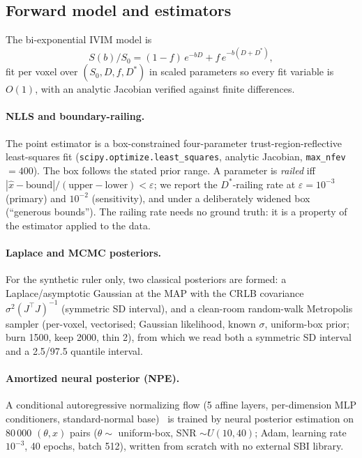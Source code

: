 \documentclass[11pt]{article}
\renewcommand{\d}{D}                 %
\newcommand{\Ds}{D^{*}}
\begin{document}
\subsection{Forward model and estimators}

The bi-exponential IVIM model is
\begin{equation}
S(b)/S_0 = (1-f)\,e^{-bD} + f\,e^{-b(D+\Ds)},
\label{eq:ivim}
\end{equation}
fit per voxel over $(S_0,\d,f,\Ds)$ in scaled parameters so every fit variable is
$O(1)$, with an analytic Jacobian verified against finite differences.

\paragraph{NLLS and boundary-railing.} The point estimator is a box-constrained
four-parameter trust-region-reflective least-squares fit
(\texttt{scipy.optimize.least\_squares}, analytic Jacobian, \texttt{max\_nfev}
$=400$). The box follows the stated prior range. A parameter is \emph{railed} iff
$|\hat{x}-\text{bound}|/(\text{upper}-\text{lower}) < \varepsilon$; we report the
$\Ds$-railing rate at $\varepsilon=10^{-3}$ (primary) and $10^{-2}$ (sensitivity),
and under a deliberately widened box (``generous bounds''). The railing rate
needs no ground truth: it is a property of the estimator applied to the data.

\paragraph{Laplace and MCMC posteriors.} For the synthetic ruler only, two
classical posteriors are formed: a Laplace/asymptotic Gaussian at the MAP with the
CRLB covariance $\sigma^2(J^\top J)^{-1}$ (symmetric SD interval), and a
clean-room random-walk Metropolis sampler (per-voxel, vectorised; Gaussian
likelihood, known $\sigma$, uniform-box prior; burn 1500, keep 2000, thin 2),
from which we read both a symmetric SD interval and a 2.5/97.5 quantile interval.

\paragraph{Amortized neural posterior (NPE).} A conditional autoregressive
normalizing flow (5 affine layers, per-dimension MLP conditioners, standard-normal
base)~\cite{papamakarios2021,cranmer2020} is trained by neural posterior
estimation on 80\,000 $(\theta,x)$ pairs ($\theta\sim$ uniform-box,
SNR $\sim U(10,40)$; Adam, learning rate $10^{-3}$, 40 epochs, batch 512),
written from scratch with no external SBI library.
\end{document}
